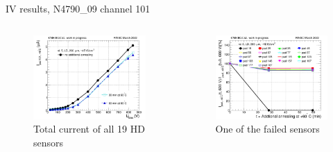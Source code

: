 \documentclass{beamer}
\begin{document}
\begin{frame}{IV results, N4790\_09 channel 101}
  \begin{columns}
       \begin{figure}
           \includegraphics[width=1.0\textwidth]{plots/annealing_IV_ch101_N4790_09.png}
           \caption{Total current of all 19 HD sensors}
       \end{figure}
       \begin{figure}
           \includegraphics[width=1.0\textwidth]{plots/annealing_current_N4790_09.png}
           \caption{One of the failed sensors}
       \end{figure}
   \end{columns}
\end{frame}
\end{document}
